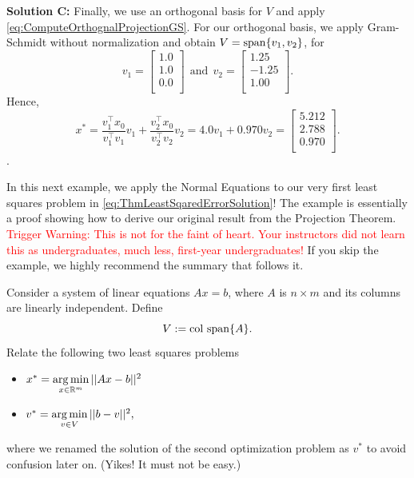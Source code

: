 \vspace*{0.2cm}
\textbf{Solution C:} Finally, we use an orthogonal basis for $V$ and apply \eqref{eq:ComputeOrthognalProjectionGS}. For our orthogonal basis, we apply Gram-Schmidt without normalization and obtain
$V=\mathrm{span} \{ v_1, v_2 \}$, for 
$$v_1=\left[
\begin{array}{c}
1.0 \\
1.0 \\
0.0\\
\end{array}
\right]
~~\text{and}~~v_2=
\left[
\begin{array}{r}
1.25 \\
-1.25 \\
1.00 \\
\end{array}
\right].
 $$
 Hence, 
 $$x^\ast = \frac{v_1^\top x_0 }{v_1^\top v_1} v_1 + \frac{v_2^\top x_0}{v_2^\top v_2} v_2  = 4.0 v_1 + 0.970 v_2 = \left[
\begin{array}{c}
5.212 \\
2.788 \\
0.970 \\
\end{array}
\right].  $$
\Qed.

\vspace*{0.2cm}

In this next example, we apply the Normal Equations to our very first least squares problem in \eqref{eq:ThmLeastSqaredErrorSolution}! The example is essentially a proof showing how to derive our original result from the Projection Theorem. \textcolor{red}{Trigger Warning: This is not for the faint of heart. Your instructors did not learn this as undergraduates, much less, first-year undergraduates!} If you skip the example, we highly recommend the summary that follows it.

\begin{example}
\label{ex:OrthongoanlProjectionforAxEquals}
Consider a system of linear equations $Ax=b$, where $A$ is $n \times m$ and its columns are linearly independent. Define 
$$ V:=\mathrm{col~span} \{ A \}.$$
Relate the following two least squares problems
\begin{itemize}
    \item $x^\ast = \operatorname*{arg\,min}\limits_{x \in \mathbb R^m} || Ax-b||^2$
    \item $v^\ast =\operatorname*{arg\,min}\limits_{v \in V}||b-v||^2,$
\end{itemize}
where we renamed the solution of the second optimization problem as $v^\ast$ to avoid confusion later on.  (Yikes! It must not be easy.) 
\end{example}


